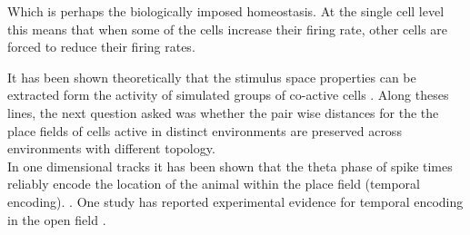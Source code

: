 Which is perhaps the biologically imposed homeostasis. At the single cell level this means that when some of the cells increase their firing rate, other cells are forced to reduce their firing rates. 


It has been shown theoretically that the stimulus space properties can be extracted form the activity of simulated groups of co-active cells \cite{Curto2008}. Along theses lines, the next question asked was whether the pair wise distances for the the place fields of cells active in distinct environments are preserved across environments with different topology. \\

In one dimensional tracks it has been shown that the theta phase of spike times reliably encode the location of the animal within the place field (temporal encoding). \cite{O'Keefe1993, Skaggs1996c, Huxter2003}. One study has reported experimental evidence for temporal encoding in the open field \cite{Huxter2008a}. 


